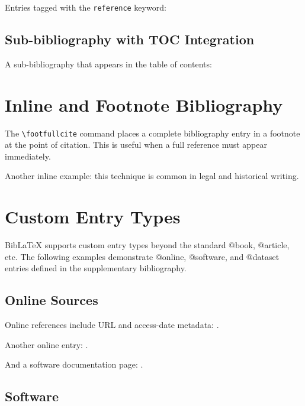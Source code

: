 \documentclass[
    language=english,
    doctype=article,
    institution=none,
]{../../omnilatex}
\begin{document}
Entries tagged with the \texttt{reference} keyword:
\printbibliography[keyword=reference,heading=subbibliography,title={Reference Works}]

\subsection{Sub-bibliography with TOC Integration}

A sub-bibliography that appears in the table of contents:
\printbibliography[heading=subbibintoc,title={Full Bibliography (integrated in TOC)}]

\section{Inline and Footnote Bibliography}
\label{sec:inline}

The \verb|\footfullcite| command places a complete bibliography entry in a
footnote at the point of citation.  This is useful when a full reference
must appear immediately.

Another inline example: this technique is common in legal and historical
writing.

\section{Custom Entry Types}
\label{sec:custom-types}

BibLaTeX supports custom entry types beyond the standard @book, @article,
etc.  The following examples demonstrate @online, @software, and @dataset
entries defined in the supplementary bibliography.

\subsection{Online Sources}

Online references include URL and access-date metadata:
\cite{GBV}.

Another online entry: \cite{TUB}.

And a software documentation page: \cite{mathworksCreateSimpleClass2020}.

\subsection{Software}
\end{document}
